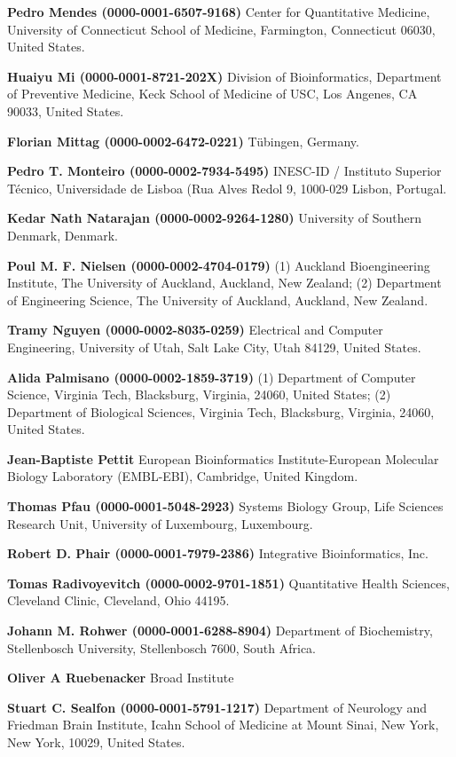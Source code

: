 \documentclass{sbml-paper}
\begin{document}
\textbf{Pedro Mendes (0000-0001-6507-9168)} Center for Quantitative Medicine, University of Connecticut School of Medicine, Farmington, Connecticut 06030, United States.

\textbf{Huaiyu Mi (0000-0001-8721-202X)} Division of Bioinformatics, Department of Preventive Medicine, Keck School of Medicine of USC, Los Angenes, CA 90033, United States.

\textbf{Florian Mittag (0000-0002-6472-0221)} Tübingen, Germany.

\textbf{Pedro T. Monteiro (0000-0002-7934-5495)} INESC-ID / Instituto Superior Técnico, Universidade de Lisboa (Rua Alves Redol 9, 1000-029 Lisbon, Portugal.

\textbf{Kedar Nath Natarajan (0000-0002-9264-1280)} University of Southern Denmark, Denmark.

\textbf{Poul M. F. Nielsen (0000-0002-4704-0179)} (1) Auckland Bioengineering Institute, The University of Auckland, Auckland, New Zealand; (2) Department of Engineering Science, The University of Auckland, Auckland, New Zealand.

\textbf{Tramy Nguyen (0000-0002-8035-0259)} Electrical and Computer Engineering, University of Utah, Salt Lake City, Utah 84129, United States.

\textbf{Alida Palmisano (0000-0002-1859-3719)} (1) Department of Computer Science, Virginia Tech, Blacksburg, Virginia, 24060,  United States; (2) Department of Biological Sciences, Virginia Tech, Blacksburg, Virginia, 24060, United States.

\textbf{Jean-Baptiste Pettit} European Bioinformatics Institute-European Molecular Biology Laboratory (EMBL-EBI), Cambridge, United Kingdom.

\textbf{Thomas Pfau (0000-0001-5048-2923)} Systems Biology Group, Life Sciences Research Unit, University of Luxembourg, Luxembourg.

\textbf{Robert D. Phair (0000-0001-7979-2386)} Integrative Bioinformatics, Inc.

\textbf{Tomas Radivoyevitch (0000-0002-9701-1851)} Quantitative Health Sciences, Cleveland Clinic, Cleveland, Ohio 44195.

\textbf{Johann M. Rohwer (0000-0001-6288-8904)} Department of Biochemistry, Stellenbosch University, Stellenbosch 7600, South Africa.

\textbf{Oliver A Ruebenacker} Broad Institute

\textbf{Stuart C. Sealfon (0000-0001-5791-1217)} Department of Neurology and Friedman Brain Institute, Icahn School of Medicine at Mount Sinai, New York, New York, 10029, United States.
\end{document}
